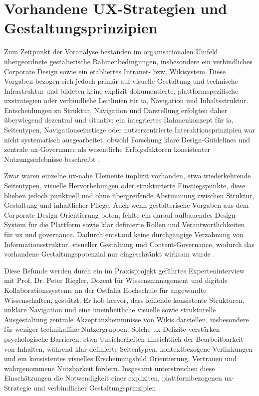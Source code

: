 \section{Vorhandene UX-Strategien und Gestaltungsprinzipien}
\label{sec:03-05_existing-ux-strategies}

Zum Zeitpunkt der Voranalyse bestanden im organisationalen Umfeld übergeordnete gestalterische Rahmenbedingungen, insbesondere ein verbindliches Corporate Design sowie ein etabliertes Intranet- bzw. Wikisystem. Diese Vorgaben bezogen sich jedoch primär auf visuelle Gestaltung und technische Infrastruktur und bildeten keine explizit dokumentierte, plattformspezifische \Gls{uxstrategien} oder verbindliche Leitlinien für \Gls{ia}, Navigation und Inhaltsstruktur. Entscheidungen zu Struktur, Navigation und Darstellung erfolgten daher überwiegend dezentral und situativ; ein integriertes Rahmenkonzept für \Gls{ia}, Seitentypen, Navigationseinstiege oder nutzerzentrierte Interaktionsprinzipien war nicht systematisch ausgearbeitet, obwohl Forschung klare Design-Guidelines und zentrale \Gls{ux}-Governance als wesentliche Erfolgsfaktoren konsistenter Nutzungserlebnisse beschreibt \cite{113:NNGIntranetGuidelines,115:NNGContentManagement}.

Zwar waren einzelne \Gls{ux}-nahe Elemente implizit vorhanden, etwa wiederkehrende Seitentypen, visuelle Hervorhebungen oder strukturierte Einstiegspunkte, diese blieben jedoch punktuell und ohne übergreifende Abstimmung zwischen Struktur, Gestaltung und inhaltlicher Pflege. Auch wenn gestalterische Vorgaben aus dem Corporate Design Orientierung boten, fehlte ein darauf aufbauendes Design-System für die Plattform sowie klar definierte Rollen und Verantwortlichkeiten für \Gls{ux} und \Gls{governance}. Dadurch entstand keine durchgängige Verzahnung von Informationsstruktur, visueller Gestaltung und Content-Governance, wodurch das vorhandene Gestaltungspotenzial nur eingeschränkt wirksam wurde \cite{113:NNGIntranetGuidelines,116:StepTwoGuidance,309:NNGContentGovernance}.

Diese Befunde werden durch ein im Praxisprojekt geführtes Experteninterview mit Prof. Dr. Peter Riegler, Dozent für Wissensmanagement und digitale Kollaborationssysteme an der Ostfalia Hochschule für angewandte Wissenschaften, gestützt. Er hob hervor, dass fehlende konsistente Strukturen, unklare Navigation und eine uneinheitliche visuelle sowie strukturelle Ausgestaltung zentrale Akzeptanzhemmnisse von Wikis darstellen, insbesondere für weniger technikaffine Nutzergruppen. Solche \Gls{ux}-Defizite verstärken psychologische Barrieren, etwa Unsicherheiten hinsichtlich der Bearbeitbarkeit von Inhalten, während klar definierte Seitentypen, kontextbezogene Verlinkungen und ein konsistentes visuelles Erscheinungsbild Orientierung, Vertrauen und wahrgenommene Nutzbarkeit fördern. Insgesamt unterstreichen diese Einschätzungen die Notwendigkeit einer expliziten, plattformbezogenen \Gls{ux}-Strategie und verbindlicher Gestaltungsprinzipien \cite{907:Riegler2025}.
